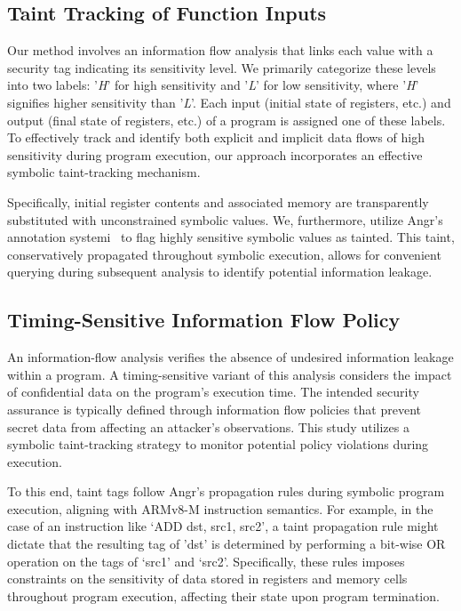 \subsection{Taint Tracking of Function Inputs}

Our method involves an information flow analysis that links each value with a security tag indicating its sensitivity level. We primarily categorize these levels into two labels: '\textit{H}' for high sensitivity and '\textit{L}' for low sensitivity, where '\textit{H}' signifies higher sensitivity than '\textit{L}'. Each input (initial state of registers, etc.) and output (final state of registers, etc.) of a program is assigned one of these labels. To effectively track and identify both explicit and implicit data flows of high sensitivity during program execution, our approach incorporates an effective symbolic taint-tracking mechanism.

Specifically, initial register contents and associated memory are
transparently substituted with unconstrained symbolic values. We,
furthermore, utilize Angr’s annotation systemi~\cite{angr} to flag highly sensitive symbolic values as tainted. This taint, conservatively propagated throughout symbolic execution, allows for convenient querying during subsequent analysis to identify potential information leakage. 

\subsection{Timing-Sensitive Information Flow Policy}

An information-flow analysis verifies the absence of undesired information leakage within a program. A timing-sensitive variant of this analysis considers the impact of confidential data on the program's execution time. The intended security assurance is typically defined through information flow policies that prevent secret data from affecting an attacker's observations. This study utilizes a symbolic taint-tracking strategy to monitor potential policy violations during execution.

To this end, taint tags follow Angr's propagation rules during symbolic program execution, aligning with ARMv8-M instruction semantics. For example, in the case of an instruction like ‘ADD dst, src1, src2’, a taint propagation rule might dictate that the resulting tag of 'dst' is determined by performing a bit-wise OR operation on the tags of ‘src1’ and ‘src2’. Specifically, these rules imposes constraints on the sensitivity of data stored in registers and memory cells throughout program execution, affecting their state upon program termination. 

